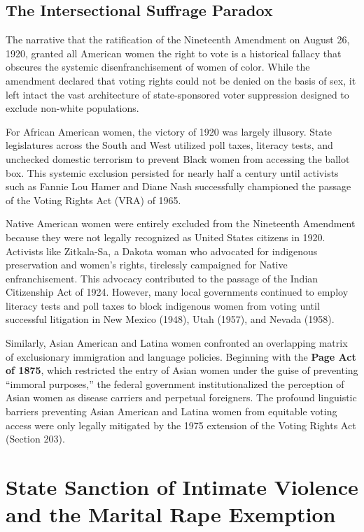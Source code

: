 \documentclass[12pt,openany]{book}
\begin{document}
\subsection{The Intersectional Suffrage Paradox}

The narrative that the ratification of the Nineteenth Amendment on August 26, 1920, granted all American women the right to vote is a historical fallacy that obscures the systemic disenfranchisement of women of color. While the amendment declared that voting rights could not be denied on the basis of sex, it left intact the vast architecture of state-sponsored voter suppression designed to exclude non-white populations.

For African American women, the victory of 1920 was largely illusory. State legislatures across the South and West utilized poll taxes, literacy tests, and unchecked domestic terrorism to prevent Black women from accessing the ballot box. This systemic exclusion persisted for nearly half a century until activists such as Fannie Lou Hamer and Diane Nash successfully championed the passage of the Voting Rights Act (VRA) of 1965.

Native American women were entirely excluded from the Nineteenth Amendment because they were not legally recognized as United States citizens in 1920. Activists like Zitkala-Sa, a Dakota woman who advocated for indigenous preservation and women's rights, tirelessly campaigned for Native enfranchisement. This advocacy contributed to the passage of the Indian Citizenship Act of 1924. However, many local governments continued to employ literacy tests and poll taxes to block indigenous women from voting until successful litigation in New Mexico (1948), Utah (1957), and Nevada (1958).

Similarly, Asian American and Latina women confronted an overlapping matrix of exclusionary immigration and language policies. Beginning with the \textbf{Page Act of 1875}, which restricted the entry of Asian women under the guise of preventing ``immoral purposes,'' the federal government institutionalized the perception of Asian women as disease carriers and perpetual foreigners. The profound linguistic barriers preventing Asian American and Latina women from equitable voting access were only legally mitigated by the 1975 extension of the Voting Rights Act (Section 203).

\section{State Sanction of Intimate Violence and the Marital Rape Exemption}
\end{document}
